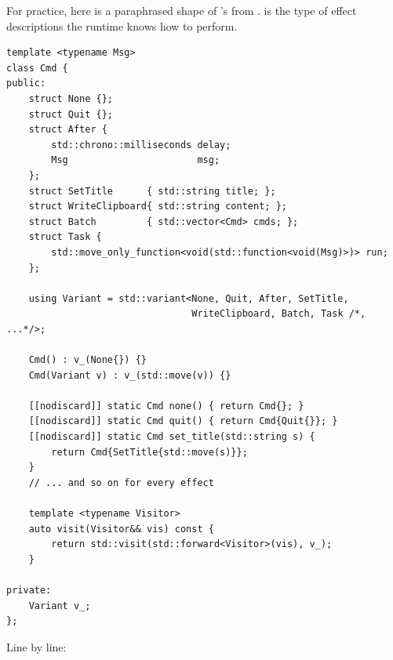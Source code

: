 For practice, here is a paraphrased shape of \maya{}'s
 from .  is the
type of effect descriptions the runtime knows how to perform.

\begin{lstlisting}
template <typename Msg>
class Cmd {
public:
    struct None {};
    struct Quit {};
    struct After {
        std::chrono::milliseconds delay;
        Msg                       msg;
    };
    struct SetTitle      { std::string title; };
    struct WriteClipboard{ std::string content; };
    struct Batch         { std::vector<Cmd> cmds; };
    struct Task {
        std::move_only_function<void(std::function<void(Msg)>)> run;
    };

    using Variant = std::variant<None, Quit, After, SetTitle,
                                 WriteClipboard, Batch, Task /*, ...*/>;

    Cmd() : v_(None{}) {}
    Cmd(Variant v) : v_(std::move(v)) {}

    [[nodiscard]] static Cmd none() { return Cmd{}; }
    [[nodiscard]] static Cmd quit() { return Cmd{Quit{}}; }
    [[nodiscard]] static Cmd set_title(std::string s) {
        return Cmd{SetTitle{std::move(s)}};
    }
    // ... and so on for every effect

    template <typename Visitor>
    auto visit(Visitor&& vis) const {
        return std::visit(std::forward<Visitor>(vis), v_);
    }

private:
    Variant v_;
};
\end{lstlisting}

Line by line:


